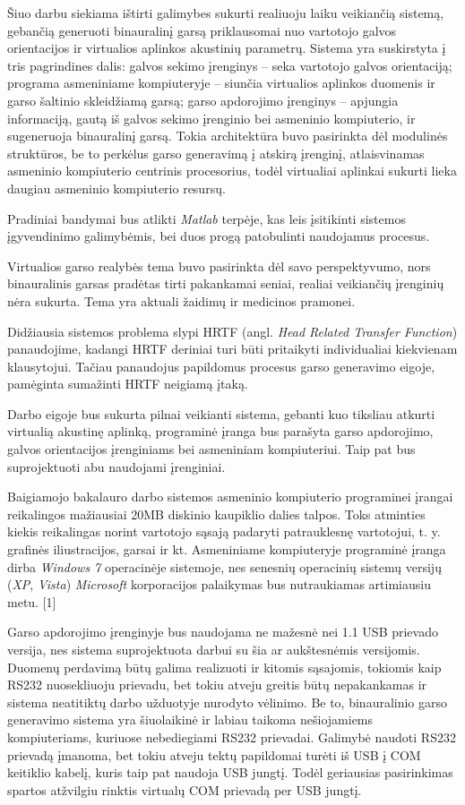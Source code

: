 \documentclass[]{vgtuef}
\begin{document}
Šiuo darbu siekiama ištirti galimybes sukurti realiuoju laiku veikiančią sistemą, gebančią generuoti binauralinį garsą priklausomai nuo vartotojo galvos orientacijos ir virtualios aplinkos akustinių parametrų. Sistema yra suskirstyta į tris pagrindines dalis: galvos sekimo įrenginys -- seka vartotojo galvos orientaciją; programa asmeniniame kompiuteryje -- siunčia virtualios aplinkos duomenis ir garso šaltinio skleidžiamą garsą; garso apdorojimo įrenginys -- apjungia informaciją, gautą iš galvos sekimo įrenginio bei asmeninio kompiuterio, ir sugeneruoja binauralinį garsą. Tokia architektūra buvo pasirinkta dėl modulinės struktūros, be to perkėlus garso generavimą į atskirą įrenginį, atlaisvinamas asmeninio kompiuterio centrinis procesorius, todėl virtualiai aplinkai sukurti lieka daugiau asmeninio kompiuterio resursų.

Pradiniai bandymai bus atlikti \textit{Matlab} terpėje, kas leis įsitikinti sistemos įgyvendinimo galimybėmis, bei duos progą patobulinti naudojamus procesus.

Virtualios garso realybės tema buvo pasirinkta dėl savo perspektyvumo, nors binauralinis garsas pradėtas tirti pakankamai seniai, realiai veikiančių įrenginių nėra sukurta. Tema yra aktuali žaidimų ir medicinos pramonei.

Didžiausia sistemos problema slypi HRTF (angl. \textit{Head Related Transfer Function}) panaudojime, kadangi HRTF deriniai turi būti pritaikyti individualiai kiekvienam klausytojui. Tačiau panaudojus papildomus procesus garso generavimo eigoje, pamėginta sumažinti HRTF neigiamą įtaką.

Darbo eigoje bus sukurta pilnai veikianti sistema, gebanti kuo tiksliau atkurti virtualią akustinę aplinką, programinė įranga bus parašyta garso apdorojimo, galvos orientacijos įrenginiams bei asmeniniam kompiuteriui. Taip pat bus suprojektuoti abu naudojami įrenginiai.

Baigiamojo bakalauro darbo sistemos asmeninio kompiuterio programinei įrangai reikalingos mažiausiai 20MB diskinio kaupiklio dalies talpos. Toks atminties kiekis 
reikalingas norint vartotojo sąsają padaryti patrauklesnę vartotojui, t. y. grafinės iliustracijos, garsai ir kt. Asmeniniame kompiuteryje programinė įranga dirba 
\textit{Windows 7} operacinėje sistemoje, nes senesnių operacinių sistemų versijų (\textit{XP}, \textit{Vista}) \textit{Microsoft} korporacijos palaikymas bus nutraukiamas artimiausiu metu. [1]

Garso apdorojimo įrenginyje bus naudojama ne mažesnė nei 1.1 USB prievado versija, nes sistema suprojektuota darbui su šia ar aukštesnėmis versijomis. Duomenų perdavimą būtų galima realizuoti ir kitomis sąsajomis, tokiomis kaip RS232 nuosekliuoju prievadu, bet tokiu atveju greitis būtų nepakankamas ir sistema neatitiktų darbo užduotyje nurodyto vėlinimo. Be to, binauralinio garso generavimo sistema yra šiuolaikinė ir labiau taikoma nešiojamiems kompiuteriams, kuriuose nebediegiami RS232 prievadai. Galimybė naudoti RS232 prievadą įmanoma, bet tokiu atveju tektų papildomai turėti iš USB į COM keitiklio kabelį, kuris taip pat naudoja USB jungtį. Todėl geriausias pasirinkimas spartos atžvilgiu rinktis virtualų COM prievadą per USB jungtį.
\end{document}
